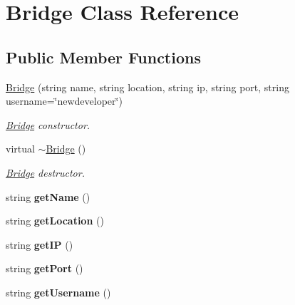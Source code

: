 \hypertarget{classBridge}{}\section{Bridge Class Reference}
\label{classBridge}
\subsection*{Public Member Functions}
\begin{DoxyCompactItemize}
\item 
\hyperlink{classBridge_a8cec44478ffd560c7d0afb2ce2751bb3}{Bridge} (string name, string location, string ip, string port, string username=\char`\"{}newdeveloper\char`\"{})
\begin{DoxyCompactList}\small\item\em \hyperlink{classBridge}{Bridge} constructor. \end{DoxyCompactList}\item 
virtual \hyperlink{classBridge_a812b325fbb4f4b589e68f11f443a7ee4}{$\sim$\+Bridge} ()\hypertarget{classBridge_a812b325fbb4f4b589e68f11f443a7ee4}{}\label{classBridge_a812b325fbb4f4b589e68f11f443a7ee4}

\begin{DoxyCompactList}\small\item\em \hyperlink{classBridge}{Bridge} destructor. \end{DoxyCompactList}\item 
string {\bfseries get\+Name} ()\hypertarget{classBridge_ac64bf3cf4afb888d67bd9f2ff361de3a}{}\label{classBridge_ac64bf3cf4afb888d67bd9f2ff361de3a}

\item 
string {\bfseries get\+Location} ()\hypertarget{classBridge_a9a29a809110d39245ad743734ccb1b0b}{}\label{classBridge_a9a29a809110d39245ad743734ccb1b0b}

\item 
string {\bfseries get\+IP} ()\hypertarget{classBridge_a3ee36f9cc8587e6186466ead7a5eb4de}{}\label{classBridge_a3ee36f9cc8587e6186466ead7a5eb4de}

\item 
string {\bfseries get\+Port} ()\hypertarget{classBridge_a08de5f59536d2f960da9bbd986a6ea0c}{}\label{classBridge_a08de5f59536d2f960da9bbd986a6ea0c}

\item 
string {\bfseries get\+Username} ()\hypertarget{classBridge_ac7cf6c4fbce9d0409a204e6647722106}{}\label{classBridge_ac7cf6c4fbce9d0409a204e6647722106}


\end{DoxyCompactItemize}
